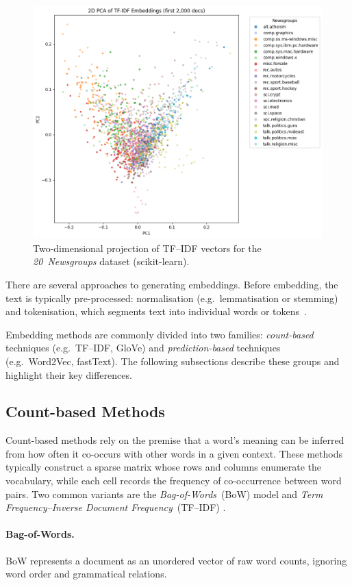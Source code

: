 \documentclass{SGGW-thesis-EN}
\begin{document}
\begin{figure}[h]
  \centering
  \includegraphics[height=9cm]{images/tfidf_embeddings.png}
  \caption{Two-dimensional projection of TF–IDF vectors for the \textit{20~Newsgroups} dataset (scikit-learn).}
  \label{fig:tfidf_embeddings}
\end{figure}

There are several approaches to generating embeddings.
Before embedding, the text is typically pre-processed: normalisation (e.g.\ lemmatisation or stemming)
and tokenisation, which segments text into individual words or tokens~\cite{jurafsky2023slp3}.

Embedding methods are commonly divided into two families:
\emph{count-based} techniques (e.g.\ TF–IDF, GloVe) and \emph{prediction-based} techniques (e.g.\ Word2Vec,
fastText).
The following subsections describe these groups and highlight their key differences.


\subsection{Count-based Methods}

Count-based methods rely on the premise that a word’s meaning can be inferred from how often it
co-occurs with other words in a given context.
These methods typically construct a sparse matrix whose rows and columns enumerate the
vocabulary, while each cell records the frequency of co-occurrence between word pairs.
Two common variants are the \textit{Bag-of-Words}~(BoW) model and \textit{Term Frequency–Inverse
Document Frequency}~(TF–IDF) \cite{jurafsky2023slp3}.
\paragraph{Bag-of-Words.}
BoW represents a document as an unordered vector of raw word counts, ignoring word order and
grammatical relations.
\end{document}
